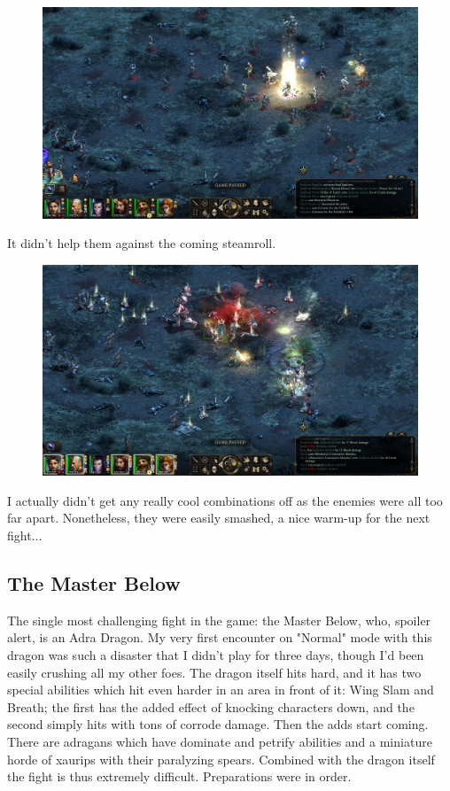 \documentclass{article}
\begin{document}
\begin{figure}
\includegraphics[scale=0.33]{files/blog/2019_03_17_pillars_of_eternity_path_of_the_damned_act_iv/2019_03_17_gathbin1.jpg}
\end{figure}

It didn't help them against the coming steamroll.

\begin{figure}
\includegraphics[scale=0.33]{files/blog/2019_03_17_pillars_of_eternity_path_of_the_damned_act_iv/2019_03_17_gathbin2.jpg}
\end{figure}

I actually didn't get any really cool combinations off as the enemies were all too far apart.  Nonetheless, they were easily smashed, a nice warm-up for the next fight...

\subsection{The Master Below}

The single most challenging fight in the game: the Master Below, who, spoiler alert, is an Adra Dragon.  My very first encounter on "Normal" mode with this dragon was such a disaster that I didn't play for three days, though I'd been easily crushing all my other foes.  The dragon itself hits hard, and it has two special abilities which hit even harder in an area in front of it: Wing Slam and Breath; the first has the added effect of knocking characters down, and the second simply hits with tons of corrode damage.  Then the adds start coming.  There are adragans which have dominate and petrify abilities and a miniature horde of xaurips with their paralyzing spears.  Combined with the dragon itself the fight is thus extremely difficult.  Preparations were in order.
\end{document}
